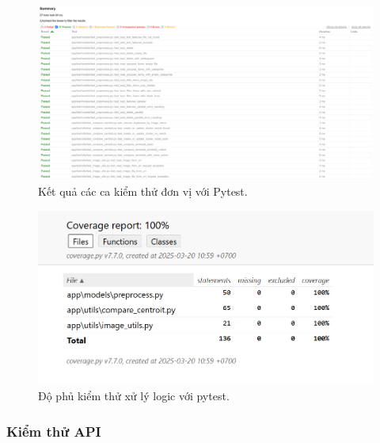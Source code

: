 \begin{figure}[H]
    \centering  
    \includegraphics[width=1\textwidth]{figures/c4/4-3/pytest.png}
    \caption{Kết quả các ca kiểm thử đơn vị với Pytest.}
    \label{fig:pytest-coverage}
\end{figure}

\begin{figure}[H]
    \centering  
    \includegraphics[width=1\textwidth]{figures/c4/4-3/pytest_2.png}
    \caption{Độ phủ kiểm thử xử lý logic với pytest.}
    \label{fig:pytest-testing}
\end{figure}


\subsubsection{Kiểm thử API}